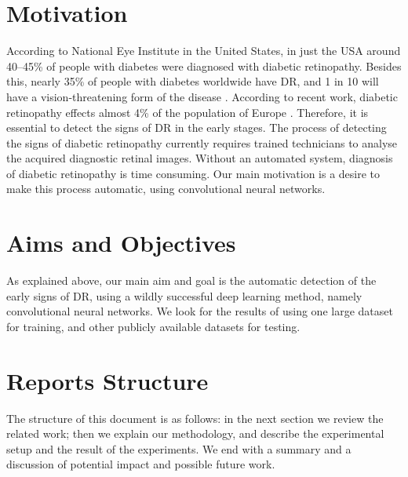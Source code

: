\section{Motivation}
According to National Eye Institute in the United States, in just the USA around 40--45\% of people with diabetes were diagnosed with diabetic retinopathy. Besides this, nearly 35\% of people with diabetes worldwide have DR, and 1 in 10 will have a vision-threatening form of the disease \citep{yau2012global}. According to recent work, diabetic retinopathy effects almost 4\% of the population of Europe \citep{nentwich2015diabetic}. Therefore, it is essential to detect the signs of DR in the early stages. The process of detecting the signs of diabetic retinopathy currently requires trained technicians to analyse the acquired diagnostic retinal images. Without an automated system, diagnosis of diabetic retinopathy is time consuming. Our main motivation is a desire to make this process automatic, using convolutional neural networks.

\section{Aims and Objectives}
As explained above, our main aim and goal is the automatic detection of the early signs of DR, using a wildly successful deep learning method, namely convolutional neural networks. We look for the results of using one large dataset for training, and other publicly available datasets for testing. 

\section{Reports Structure}
The structure of this document is as follows: in the next section we review the related work; then we explain our methodology, and describe the experimental setup and the result of the experiments. We end with a summary and a discussion of potential impact and possible future work.
